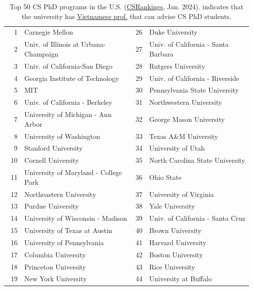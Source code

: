 \documentclass[oneside,11pt]{memoir}
\newcommand{\red}[1]{{\color{red}{#1}}}
\begin{document}
\begin{table}
  \centering
  \small
  \caption{Top 50 CS PhD programs in the U.S. (\href{https://csrankings.org}{CSRankings}, Jan. 2024). \red{$^*$} indicates that the university has \href{https://github.com/dynaroars/dynaroars.github.io/wiki/Viet-CS-Profs-US}{Vietnamese prof.} that can advise CS PhD students.}\label{tab:ranking}
  \begin{tabular}{rl|rl}
    \toprule
    1 & Carnegie Mellon & 26 & Duke University \\
    2 & Univ. of Illinois at Urbana-Champaign\red{$^*$}  & 27 & Univ. of California - Santa Barbara \\  
    3 & Univ. of California-San Diego & 28 & Rutgers University\red{$^*$} \\
    4 & Georgia Institute of Technology & 29 & Univ. of California - Riverside\\
    5 & MIT                            & 30 & Pennsylvania State University  \\
    6 & Univ. of California - Berkeley& 31 & Northwestern University\\
    7 & University of Michigan - Ann Arbor\red{$^*$}   & 32& George Mason University\red{$^*$}\\  
    8 & University of Washington      &33 &  Texas A\&M University\red{$^*$} \\
    9 &  Stanford University  &34&  University of Utah \\
    10 & Cornell University  & 35 &  North Carolina State University\\\  
    11 & University of Maryland - College Park &  36& Ohio State \\ 
    12 & Northeastern University\red{$^*$} &37& University of Virginia  \\ 
    13 & Purdue University &38& Yale University \\ 
    14 & University of Wisconsin - Madison\red{$^*$} &39 & Univ. of California - Santa Cruz \\
    15 & University of Texas at Austin &40& Brown University \\ 
    16 & University of Pennsylvania &41 & Harvard University \\
    17 & Columbia University\red{$^*$} &42 & Boston University  \\
    18 & Princeton University\red{$^*$}  & 43& Rice University\\
    19 & New York University  & 44&  University at Buffalo\red{$^*$}\\

\end{tabular}
\end{table}
\end{document}
